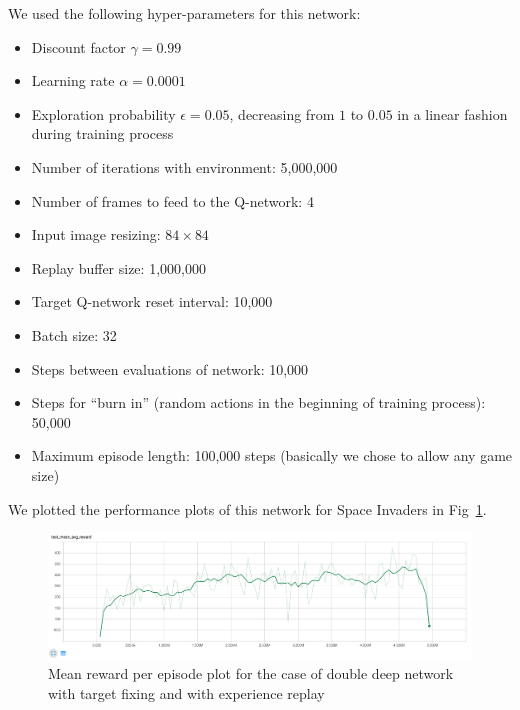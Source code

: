 \documentclass{article}
\begin{document}
We used the following hyper-parameters for this network:
\begin{itemize}
  \item Discount factor $\gamma=0.99$
  \item Learning rate $\alpha=0.0001$
  \item Exploration probability $\epsilon=0.05$, decreasing from $1$ to $0.05$ in a linear fashion during training process
  \item Number of iterations with environment: 5,000,000
  \item Number of frames to feed to the Q-network: 4
  \item Input image resizing: $84\times84$
  \item Replay buffer size: 1,000,000
  \item Target Q-network reset interval: 10,000
  \item Batch size: 32
  \item Steps between evaluations of network: 10,000
  \item Steps for ``burn in'' (random actions in the beginning of training process): 50,000
  \item Maximum episode length: 100,000 steps (basically we chose to allow any game size)
\end{itemize}

We plotted the performance plots of this network for Space Invaders in Fig~\ref{fig:r_q6}.


\begin{figure}[h] 
  \centering
  \label{fig:r_q6}
  \includegraphics[width=1.0\textwidth]{images/r_q6}
  \caption{Mean reward per episode plot for the case of double deep network with target fixing and with experience replay}
\end{figure}
\end{document}
